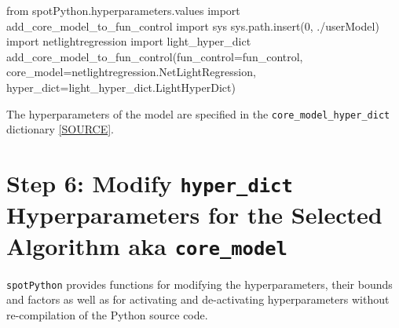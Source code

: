\documentclass[
  letterpaper,
  DIV=11,
  numbers=noendperiod]{scrreprt}
\newenvironment{Shaded}{\begin{snugshade}}{\end{snugshade}}
\newcommand{\DecValTok}[1]{\textcolor[rgb]{0.68,0.00,0.00}{#1}}
\newcommand{\ImportTok}[1]{\textcolor[rgb]{0.00,0.46,0.62}{#1}}
\newcommand{\NormalTok}[1]{\textcolor[rgb]{0.00,0.23,0.31}{#1}}
\newcommand{\OperatorTok}[1]{\textcolor[rgb]{0.37,0.37,0.37}{#1}}
\newcommand{\StringTok}[1]{\textcolor[rgb]{0.13,0.47,0.30}{#1}}
\begin{document}
\begin{Shaded}
\begin{Highlighting}[]
\ImportTok{from}\NormalTok{ spotPython.hyperparameters.values }\ImportTok{import}\NormalTok{ add\_core\_model\_to\_fun\_control}
\ImportTok{import}\NormalTok{ sys}
\NormalTok{sys.path.insert(}\DecValTok{0}\NormalTok{, }\StringTok{\textquotesingle{}./userModel\textquotesingle{}}\NormalTok{)}
\ImportTok{import}\NormalTok{ netlightregression}
\ImportTok{import}\NormalTok{ light\_hyper\_dict}
\NormalTok{add\_core\_model\_to\_fun\_control(fun\_control}\OperatorTok{=}\NormalTok{fun\_control,}
\NormalTok{                              core\_model}\OperatorTok{=}\NormalTok{netlightregression.NetLightRegression,}
\NormalTok{                              hyper\_dict}\OperatorTok{=}\NormalTok{light\_hyper\_dict.LightHyperDict)}
\end{Highlighting}
\end{Shaded}

The hyperparameters of the model are specified in the
\texttt{core\_model\_hyper\_dict} dictionary
\href{https://github.com/sequential-parameter-optimization/spotPython/blob/main/src/spotPython/hyperdict/light_hyper_dict.json}{{[}SOURCE{]}}.

\section{\texorpdfstring{Step 6: Modify \texttt{hyper\_dict}
Hyperparameters for the Selected Algorithm aka
\texttt{core\_model}}{Step 6: Modify hyper\_dict Hyperparameters for the Selected Algorithm aka core\_model}}\label{sec-modification-of-hyperparameters-33}

\texttt{spotPython} provides functions for modifying the
hyperparameters, their bounds and factors as well as for activating and
de-activating hyperparameters without re-compilation of the Python
source code.
\end{document}
